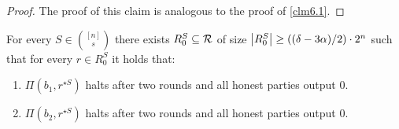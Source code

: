 \begin{proof}
	The proof of this claim is analogous to the proof of \cref{clm6.1}.
\end{proof}

\begin{claim}\label{clm6.2}
	For every $S \in \binom{[n]}{s}$ there exists $R^S_{0} \subseteq \mathcal{R}$ of size ${\left\lvert R^S_{0} \right\rvert \geq ((\delta-3\alpha)/2) \cdot 2^{n}}$ such that for every $r \in R^S_{0}$ it holds that:
	\begin{enumerate}
		\item $\Pi(b_1,r^{\star S})$ halts after two rounds and all honest parties output $0$.
		\item $\Pi(b_2,r^{\star S})$ halts after two rounds and all honest parties output $0$.
	\end{enumerate}
\end{claim}

